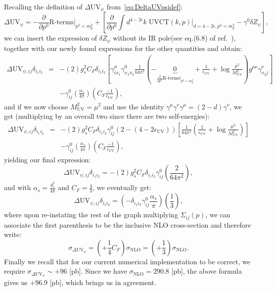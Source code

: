 \documentclass[11pt]{article}
\begin{document}
Recalling the definition of $\Delta \textrm{UV}_\psi$ from~\eqref{eq:DeltaUVpsidef}:
\begin{equation}
\Delta \textrm{UV}_\psi = -\frac{\partial}{\partial p^0}\textrm{R-terms}|_{p^2=m_p^2}  + \left[
\frac{\partial}{\partial p^0} \int d^{4-2\epsilon}k\; \textrm{UVCT}(k,p){\Big |}_{d=4-2\epsilon, p^2=m_p^2 }
- \gamma^0 \delta Z_\psi
\right ],
\end{equation}
we can insert the expression of $\delta Z_\psi$ without its IR pole(see eq.(6.8) of ref.~\cite{Gnendiger:2017pys}), together with our newly found expressions for the other quantities and obtain:
\begin{eqnarray}
\Delta \textrm{UV}_{\psi,ij} \delta_{i_1 i_2} &=& -(2)g_s^2 C_F \delta_{i_1 i_2} \left[ 
\gamma_{i x_1}^\mu
\gamma_{x_1 x_2}^0 \frac{1}{64\pi^2}\left(
-\underbrace{0}_{\frac{\partial}{\partial p^0}\textrm{R-terms}|_{p^2=m_p^2}}+
\frac{1}{\epsilon_\textrm{UV}} + \log{\frac{\mu^2}{M_\textrm{UV}^2}}
\right)
g^{\mu\nu}\gamma_{x_2 j}^\nu
\right] \nonumber \\
&&- \gamma^0_{ij}\left(\frac{\alpha_s}{4\pi}\right) \left( C_F \frac{-1}{\epsilon_{\textrm{UV}}} \right),
\end{eqnarray}
and if we now choose $M_\textrm{UV}^2=\mu^2$ and use the identity $\gamma^\mu \gamma^\nu \gamma^\mu=(2-d) \gamma^\nu$, we get (multiplying by an overall two since there are two self-energies):
\begin{eqnarray}
\Delta \textrm{UV}_{\psi,ij} \delta_{i_1 i_2} &=& -(2)g_s^2 C_F \delta_{i_1 i_2}\gamma_{i j}^0 (2-(4-2\epsilon_\textrm{UV})) \left[ 
\frac{1}{64\pi^2}\left(
\frac{1}{\epsilon_\textrm{UV}} + \log{\frac{\mu^2}{M_\textrm{UV}^2}}
\right)
\right] \nonumber \\
&&- \gamma^0_{ij}\left(\frac{\alpha_s}{4\pi}\right) \left( C_F \frac{-1}{\epsilon_{\textrm{UV}}} \right),
\end{eqnarray}
yielding our final expression:
\begin{equation}
\Delta \textrm{UV}_{\psi,ij} \delta_{i_1 i_2} = -(2)g_s^2 C_F \delta_{i_1 i_2} \gamma^0_{ij} \left( 
\frac{2}{64\pi^2}
\right),
\end{equation}
and with $\alpha_s=\frac{g_s^2}{4\pi}$ and $C_F=\frac{4}{3}$, we eventually get:
\begin{equation}
\Delta \textrm{UV}_{\psi,ij} \delta_{i_1 i_2} = \left( -\delta_{i_1 i_2} \gamma^0_{ij} \frac{\alpha_s}{\pi} \right) \left(\frac{1}{3}\right), 
\end{equation}
where upon re-instating the rest of the graph multiplying $\Sigma_{ij}(p)$, we can associate the first parenthesis to be the inclusive NLO cross-section and therefore write:
\begin{equation}
\sigma_{\Delta \textrm{UV}_{\psi}} = \left(+\frac{1}{4}C_F\right) \sigma_{\textrm{NLO}}=\left(+\frac{1}{3}\right) \sigma_{\textrm{NLO}}.
\end{equation}
Finally we recall that for our current numerical implementation to be correct, we require $\sigma_{\Delta \textrm{UV}_{\psi}}\sim +96$ [pb]. Since we have $\sigma_{\textrm{NLO}}=290.8$ [pb], the above formula gives us $+96.9$ [pb], which brings us in agreement.
\end{document}
